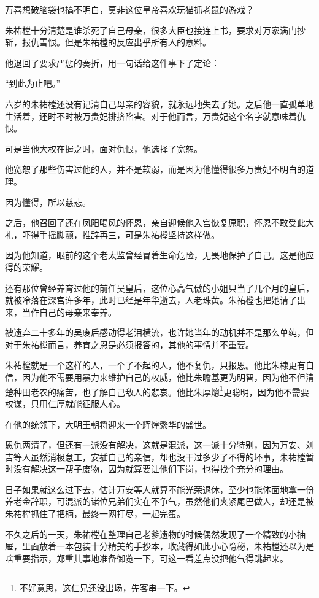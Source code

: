 \begin{multicols}{\theparacolNo}
		万喜想破脑袋也搞不明白，莫非这位皇帝喜欢玩猫抓老鼠的游戏？

		朱祐樘十分清楚是谁杀死了自己母亲，很多大臣也接连上书，要求对万家满门抄斩，报仇雪恨。但是朱祐樘的反应出乎所有人的意料。

		他退回了要求严惩的奏折，用一句话给这件事下了定论：

		“到此为止吧。”

		六岁的朱祐樘还没有记清自己母亲的容貌，就永远地失去了她。之后他一直孤单地生活着，还时不时被万贵妃排挤陷害。对于他而言，万贵妃这个名字就意味着仇恨。

		可是当他大权在握之时，面对仇恨，他选择了宽恕。

		他宽恕了那些伤害过他的人，并不是软弱，而是因为他懂得很多万贵妃不明白的道理。

		因为懂得，所以慈悲。

		之后，他召回了还在凤阳喝风的怀恩，亲自迎候他入宫恢复原职，怀恩不敢受此大礼，吓得手摇脚颤，推辞再三，可是朱祐樘坚持这样做。

		因为他知道，眼前的这个老太监曾经冒着生命危险，无畏地保护了自己。这是他应得的荣耀。

		还有那位曾经养育过他的前任吴皇后，这位心高气傲的小姐只当了几个月的皇后，就被冷落在深宫许多年，此时已经是年华逝去，人老珠黄。朱祐樘也把她请了出来，当作自己的母亲来奉养。

		被遗弃二十多年的吴废后感动得老泪横流，也许她当年的动机并不是那么单纯，但对于朱祐樘而言，养育之恩是必须报答的，其他的事情并不重要。

		朱祐樘就是一个这样的人，一个了不起的人，他不复仇，只报恩。他比朱棣更有自信，因为他不需要用暴力来维护自己的权威，他比朱瞻基更为明智，因为他不但清楚种田老农的痛苦，也了解自己敌人的悲哀。他比朱厚熜\footnote{不好意思，这仁兄还没出场，先客串一下。}更聪明，因为他不需要权谋，只用仁厚就能征服人心。

		在他的统领下，大明王朝将迎来一个辉煌繁华的盛世。

		恩仇两清了，但还有一派没有解决，这就是混派，这一派十分特别，因为万安、刘吉等人虽然消极怠工，安插自己的亲信，却也没干过多少了不得的坏事，朱祐樘暂时没有解决这一帮子废物，因为就算要让他们下岗，也得找个充分的理由。

		日子如果就这么过下去，估计万安等人就算不能光荣退休，至少也能体面地拿一份养老金辞职，可混派的诸位兄弟们实在不争气，虽然他们夹紧尾巴做人，却还是被朱祐樘抓住了把柄，最终一网打尽，一起完蛋。

		不久之后的一天，朱祐樘在整理自己老爹遗物的时候偶然发现了一个精致的小抽屉，里面放着一本包装十分精美的手抄本，收藏得如此小心隐秘，朱祐樘还以为是啥重要指示，郑重其事地准备御览一下，可这一看差点没把他气得跳起来。


\end{multicols}
